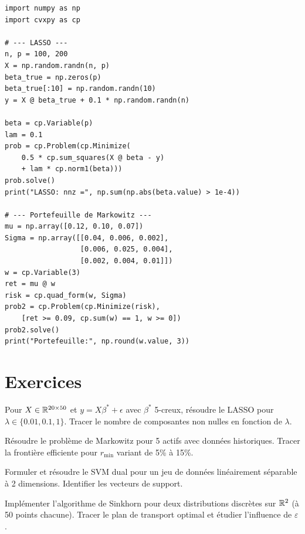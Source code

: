 \begin{codeblock}[title=\textbf{LASSO et portefeuille avec CVXPY}]
\begin{verbatim}
import numpy as np
import cvxpy as cp

# --- LASSO ---
n, p = 100, 200
X = np.random.randn(n, p)
beta_true = np.zeros(p)
beta_true[:10] = np.random.randn(10)
y = X @ beta_true + 0.1 * np.random.randn(n)

beta = cp.Variable(p)
lam = 0.1
prob = cp.Problem(cp.Minimize(
    0.5 * cp.sum_squares(X @ beta - y)
    + lam * cp.norm1(beta)))
prob.solve()
print("LASSO: nnz =", np.sum(np.abs(beta.value) > 1e-4))

# --- Portefeuille de Markowitz ---
mu = np.array([0.12, 0.10, 0.07])
Sigma = np.array([[0.04, 0.006, 0.002],
                  [0.006, 0.025, 0.004],
                  [0.002, 0.004, 0.01]])
w = cp.Variable(3)
ret = mu @ w
risk = cp.quad_form(w, Sigma)
prob2 = cp.Problem(cp.Minimize(risk),
    [ret >= 0.09, cp.sum(w) == 1, w >= 0])
prob2.solve()
print("Portefeuille:", np.round(w.value, 3))
\end{verbatim}
\end{codeblock}

\section{Exercices}

\begin{exercice}
Pour $X \in \mathbb{R}^{20 \times 50}$ et $y = X\beta^* + \epsilon$ avec
$\beta^*$ 5-creux, r\'esoudre le LASSO pour $\lambda \in \{0.01, 0.1, 1\}$.
Tracer le nombre de composantes non nulles en fonction de $\lambda$.
\end{exercice}

\begin{exercice}
R\'esoudre le probl\`eme de Markowitz pour 5 actifs avec donn\'ees
historiques. Tracer la fronti\`ere efficiente pour $r_{\min}$ variant de
5\% \`a 15\%.
\end{exercice}

\begin{exercice}
Formuler et r\'esoudre le SVM dual pour un jeu de donn\'ees lin\'eairement
s\'eparable \`a 2 dimensions. Identifier les vecteurs de support.
\end{exercice}

\begin{exercice}
Impl\'ementer l'algorithme de Sinkhorn pour deux distributions discr\`etes
sur $\mathbb{R}^2$ (\`a 50 points chacune). Tracer le plan de transport optimal et
\'etudier l'influence de $\varepsilon$.
\end{exercice}

